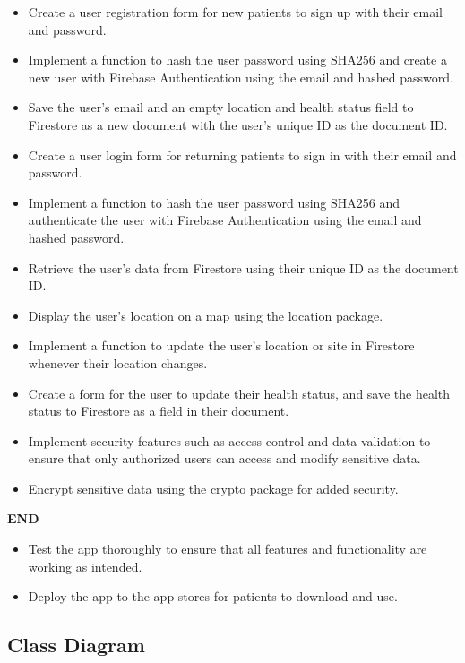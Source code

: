\documentclass[12pt]{article}
\begin{document}
			\begin{itemize}
				\item Create a user registration form for new patients to sign up with their email and password.
				\item Implement a function to hash the user password using SHA256 and create a new user with Firebase Authentication using the email and hashed password.
				\item Save the user's email and an empty location and health status field to Firestore as a new document with the user's unique ID as the document ID.
				\item Create a user login form for returning patients to sign in with their email and password.
				\item Implement a function to hash the user password using SHA256 and authenticate the user with Firebase Authentication using the email and hashed password.
				\item Retrieve the user's data from Firestore using their unique ID as the document ID.
				\item Display the user's location on a map using the location package.
				\item Implement a function to update the user's location or site in Firestore whenever their location changes.
				\item Create a form for the user to update their health status, and save the health status to Firestore as a field in their document.
				\item Implement security features such as access control and data validation to ensure that only authorized users can access and modify sensitive data.
				\item Encrypt sensitive data using the crypto package for added security.
				
			\end{itemize}
			\textbf{END}
			\begin{itemize}
				\item Test the app thoroughly to ensure that all features and functionality are working as intended.
				\item Deploy the app to the app stores for patients to download and use.
				
			\end{itemize}
		
			\subsection{Class Diagram}
\end{document}
